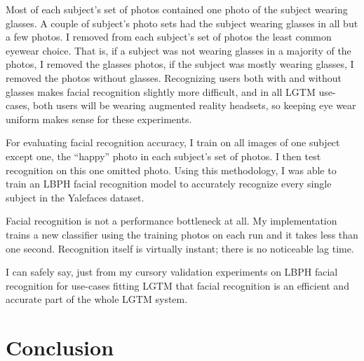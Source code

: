 \documentclass[12pt]{report}
\begin{document}
Most of each subject's set of photos contained one photo of the subject wearing glasses. A couple of subject's photo sets had the subject wearing glasses in all but a few photos. I removed from each subject's set of photos the least common eyewear choice. That is, if a subject was not wearing glasses in a majority of the photos, I removed the glasses photos, if the subject was mostly wearing glasses, I removed the photos without glasses. Recognizing users both with and without glasses makes facial recognition slightly more difficult, and in all LGTM use-cases, both users will be wearing augmented reality headsets, so keeping eye wear uniform makes sense for these experiments. \par

For evaluating facial recognition accuracy, I train on all images of one subject except one, the ``happy'' photo in each subject's set of photos. I then test recognition on this one omitted photo. Using this methodology, I was able to train an LBPH facial recognition model to accurately recognize every single subject in the Yalefaces dataset. \par

Facial recognition is not a performance bottleneck at all. My implementation trains a new classifier using the training photos on each run and it takes less than one second. Recognition itself is virtually instant; there is no noticeable lag time. \par

I can safely say, just from my cursory validation experiments on LBPH facial recognition for use-cases fitting LGTM that facial recognition is an efficient and accurate part of the whole LGTM system. \par



\chapter{Conclusion}
\end{document}
